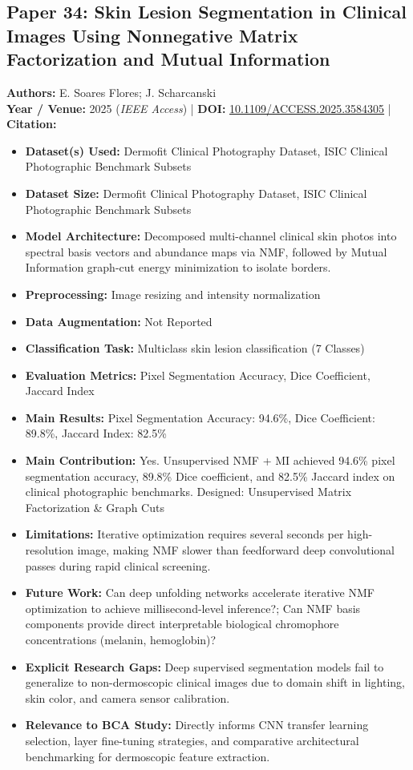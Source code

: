 \documentclass[11pt,a4paper]{article}
\begin{document}
\subsection{Paper 34: Skin Lesion Segmentation in Clinical Images Using Nonnegative Matrix Factorization and Mutual Information}
\textbf{Authors:} E. Soares Flores; J. Scharcanski \\
\textbf{Year / Venue:} 2025 (\textit{IEEE Access}) | \textbf{DOI:} \href{https://doi.org/10.1109/ACCESS.2025.3584305}{10.1109/ACCESS.2025.3584305} | \textbf{Citation:} \cite{11058930}

\begin{itemize}\small
\item \textbf{Dataset(s) Used:} Dermofit Clinical Photography Dataset, ISIC Clinical Photographic Benchmark Subsets
\item \textbf{Dataset Size:} Dermofit Clinical Photography Dataset, ISIC Clinical Photographic Benchmark Subsets
\item \textbf{Model Architecture:} Decomposed multi-channel clinical skin photos into spectral basis vectors and abundance maps via NMF, followed by Mutual Information graph-cut energy minimization to isolate borders.
\item \textbf{Preprocessing:} Image resizing and intensity normalization
\item \textbf{Data Augmentation:} Not Reported
\item \textbf{Classification Task:} Multiclass skin lesion classification (7 Classes)
\item \textbf{Evaluation Metrics:} Pixel Segmentation Accuracy, Dice Coefficient, Jaccard Index
\item \textbf{Main Results:} Pixel Segmentation Accuracy: 94.6\%, Dice Coefficient: 89.8\%, Jaccard Index: 82.5\%
\item \textbf{Main Contribution:} Yes. Unsupervised NMF + MI achieved 94.6\% pixel segmentation accuracy, 89.8\% Dice coefficient, and 82.5\% Jaccard index on clinical photographic benchmarks. Designed: Unsupervised Matrix Factorization \& Graph Cuts
\item \textbf{Limitations:} Iterative optimization requires several seconds per high-resolution image, making NMF slower than feedforward deep convolutional passes during rapid clinical screening.
\item \textbf{Future Work:} Can deep unfolding networks accelerate iterative NMF optimization to achieve millisecond-level inference?; Can NMF basis components provide direct interpretable biological chromophore concentrations (melanin, hemoglobin)?
\item \textbf{Explicit Research Gaps:} Deep supervised segmentation models fail to generalize to non-dermoscopic clinical images due to domain shift in lighting, skin color, and camera sensor calibration.
\item \textbf{Relevance to BCA Study:} Directly informs CNN transfer learning selection, layer fine-tuning strategies, and comparative architectural benchmarking for dermoscopic feature extraction.
\end{itemize}
\end{document}
